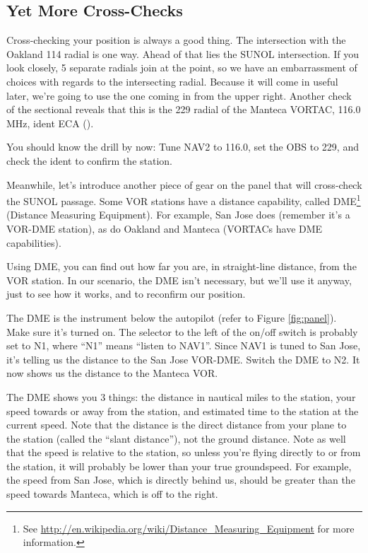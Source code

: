 \subsection{Yet More Cross-Checks}

Cross-checking your position is always a good thing.  The intersection
with the Oakland 114 radial is one way.  Ahead of that lies the SUNOL intersection.  If you look
closely, 5 separate radials join at the point, so we have an
embarrassment of choices with regards to the intersecting radial.
Because it will come in useful later, we're going to use the one
coming in from the upper right.  Another check of the sectional
reveals that this is the 229 radial of the Manteca VORTAC, 116.0 MHz,
ident ECA (\mdot\mspace \mdash\mdot\mdash\mdot\mspace \mdot\mdash).


You should know the drill by now: Tune NAV2 to 116.0, set the OBS to
229, and check the ident to confirm the station.

Meanwhile, let's introduce another piece of gear on the panel that
will cross-check the SUNOL passage.  Some VOR stations have a distance
capability, called DME\footnote{See
  \url{http://en.wikipedia.org/wiki/Distance_Measuring_Equipment} for
  more information.} (Distance Measuring Equipment).  For example, San
Jose does (remember it's a VOR-DME station), as do Oakland and Manteca
(VORTACs have DME capabilities).

Using DME, you can find out how far you are, in straight-line
distance, from the VOR station.  In our scenario, the DME isn't
necessary, but we'll use it anyway, just to see how it works, and to
reconfirm our position.

The DME is the instrument below the autopilot (refer to Figure
\ref{fig:panel}).  Make sure it's turned on.  The selector to the left
of the on/off switch is probably set to N1, where ``N1'' means
``listen to NAV1''.  Since NAV1 is tuned to San Jose, it's telling us
the distance to the San Jose VOR-DME.  Switch the DME to
N2.  It now shows us the
distance to the Manteca VOR.

The DME shows you 3 things: the distance in nautical miles to the
station, your speed towards or away from the station, and estimated
time to the station at the current speed.  Note that the distance is
the direct distance from your plane to the station (called the ``slant
distance''), not the ground distance.  Note as well that the speed is
relative to the station, so unless you're flying directly to or from
the station, it will probably be lower than your true groundspeed.
For example, the speed from San Jose, which is directly behind us,
should be greater than the speed towards Manteca, which is off to the
right.

